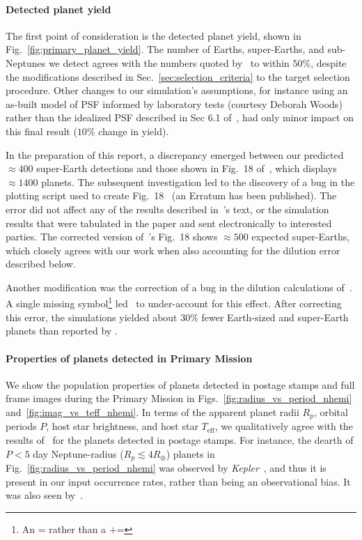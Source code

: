 \paragraph{Detected planet yield}
The first point of consideration is the detected planet yield, shown in Fig.~\ref{fig:primary_planet_yield}.
The number of Earths, super-Earths, and sub-Neptunes we detect agrees with the 
numbers quoted by~ to within $50\%$, despite the 
modifications described in Sec.~\ref{sec:selection_criteria} to the target 
selection procedure.
Other changes to our simulation's assumptions, for instance using an as-built 
model of \tesss PSF informed by laboratory tests (courtesy Deborah Woods) 
rather than the idealized PSF described in Sec 6.1 
of~, had only minor impact on this final result 
($10\%$ change in yield).

In the preparation of this report, a
discrepancy emerged between our predicted $\approx 400$ super-Earth detections 
and those shown in Fig.~18 of~, which 
displays $\approx1400$ planets. The subsequent investigation led to the 
discovery of a bug in the plotting script used to create 
Fig.~18~ (an Erratum has been published). The 
error did not
affect any of the results described in~'s text, or 
the simulation results that were tabulated in the paper and sent electronically 
to interested parties.
The corrected version 
of~'s Fig.~18 shows $\approx 500$ expected 
super-Earths, which closely agrees with our work when also accounting for the 
dilution error described below.

Another modification was the correction of a bug in the dilution calculations
of~. A single missing symbol\footnote{An $\texttt{=}$ rather than 
a $\texttt{+=}$} led~ to under-account for this 
effect. After correcting this error, the simulations yielded
about 30\% fewer Earth-sized and super-Earth planets than reported by .

\paragraph{Properties of planets detected in Primary Mission} 

We show the population properties of planets detected in postage
stamps and full frame images during the Primary Mission in
Figs.~\ref{fig:radius_vs_period_nhemi}
and~\ref{fig:imag_vs_teff_nhemi}.  In terms of the apparent planet
radii $R_p$, orbital periods $P$, host star brightness, and host star
$T_\mathrm{eff}$, we qualitatively agree with the results
of~ for the planets detected
in postage stamps. 
For instance, the dearth of $P<5$ day
Neptune-radius ($R_p \lesssim 4R_\oplus$) planets in 
Fig.~\ref{fig:radius_vs_period_nhemi} was
observed by \textit{Kepler}~\citep{mazeh_dearth_2016}, and thus it is
present in our input occurrence rates, rather than being an
observational bias.  It was also seen by~.

